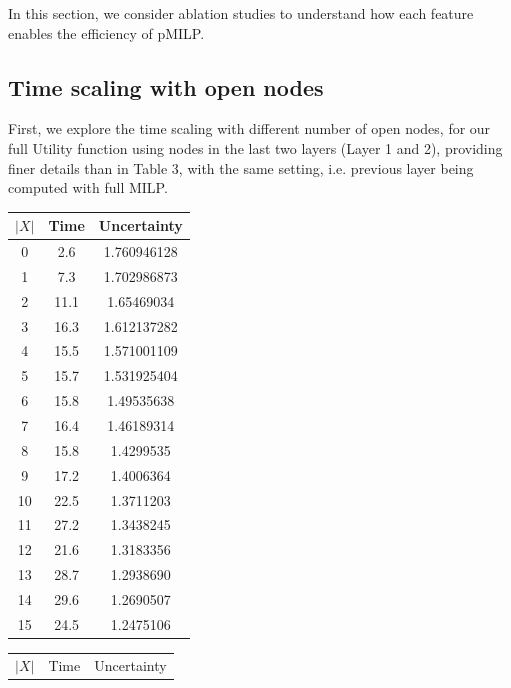 In this section, we consider ablation studies to understand how each feature enables the efficiency of pMILP.

\subsection*{Time scaling with open nodes}	

First, we explore the time scaling with different number of open nodes, for our full Utility function using nodes in the last two layers (Layer 1 and 2), providing finer details than in Table 3, with the same setting, i.e. previous layer being computed with full MILP.





\begin{table}[h!]
		\centering
		\hspace*{4ex}
		\begin{subtable}[b]{0.45\textwidth}
		\begin{tabular}{|c|c|c|}
		\hline
		$|X|$ & Time & Uncertainty\\ 
		\hline	0 & 2.6 & 1.760946128\\
		\hline	1 & 7.3 & 1.702986873\\
		\hline	2 & 11.1 & 1.65469034\\
		\hline	3 & 16.3 & 1.612137282\\
		\hline	4 & 15.5 & 1.571001109\\
		\hline	5 & 15.7 & 1.531925404\\
		\hline	6 & 15.8 & 1.49535638\\
		\hline	7 & 16.4 & 1.46189314\\
		\hline	8 &  15.8 & 1.4299535\\
		\hline	9 &  17.2 & 1.4006364\\
		\hline	10 & 22.5 & 1.3711203\\
		\hline	11 & 27.2 & 1.3438245\\
		\hline	12 & 21.6 & 1.3183356\\
		\hline	13 & 28.7 & 1.2938690\\
		\hline	14 & 29.6 & 1.2690507\\
		\hline	15 & 24.5 & 1.2475106\\
		\hline
	  \end{tabular}
	\end{subtable}
	\hfill
	\begin{subtable}[b]{0.45\textwidth}
		\begin{tabular}{|c|c|c|}
			\hline
			$|X|$ & Time & Uncertainty\\ 

\end{tabular}
\end{subtable}
\end{table}
